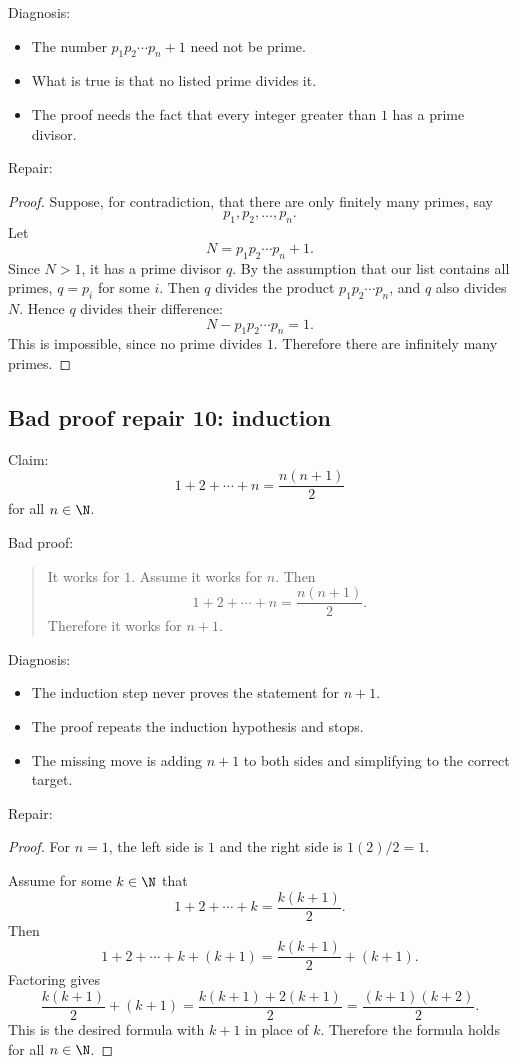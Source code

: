 Diagnosis:

\begin{itemize}
\item The number $p_1p_2\cdots p_n+1$ need not be prime.
\item What is true is that no listed prime divides it.
\item The proof needs the fact that every integer greater than $1$ has a prime divisor.
\end{itemize}

Repair:

\begin{proof}
Suppose, for contradiction, that there are only finitely many primes, say
\[
p_1,p_2,\ldots,p_n.
\]
Let
\[
N=p_1p_2\cdots p_n+1.
\]
Since $N>1$, it has a prime divisor $q$. By the assumption that our list contains all primes, $q=p_i$ for some $i$. Then $q$ divides the product $p_1p_2\cdots p_n$, and $q$ also divides $N$. Hence $q$ divides their difference:
\[
N-p_1p_2\cdots p_n=1.
\]
This is impossible, since no prime divides $1$. Therefore there are infinitely many primes.
\end{proof}

\subsection{Bad proof repair 10: induction}

Claim:
\[
1+2+\cdots+n=\frac{n(n+1)}2
\]
for all $n\in\N$.

Bad proof:

\begin{quote}
It works for $1$. Assume it works for $n$. Then
\[
1+2+\cdots+n=\frac{n(n+1)}2.
\]
Therefore it works for $n+1$.
\end{quote}

Diagnosis:

\begin{itemize}
\item The induction step never proves the statement for $n+1$.
\item The proof repeats the induction hypothesis and stops.
\item The missing move is adding $n+1$ to both sides and simplifying to the correct target.
\end{itemize}

Repair:

\begin{proof}
For $n=1$, the left side is $1$ and the right side is $1(2)/2=1$.

Assume for some $k\in\N$ that
\[
1+2+\cdots+k=\frac{k(k+1)}2.
\]
Then
\[
1+2+\cdots+k+(k+1)=\frac{k(k+1)}2+(k+1).
\]
Factoring gives
\[
\frac{k(k+1)}2+(k+1)=\frac{k(k+1)+2(k+1)}2=\frac{(k+1)(k+2)}2.
\]
This is the desired formula with $k+1$ in place of $k$. Therefore the formula holds for all $n\in\N$.
\end{proof}

